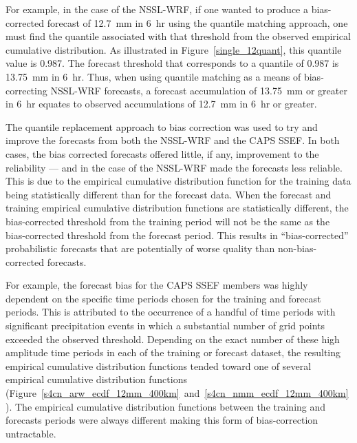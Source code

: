 For example, in the case of the NSSL-WRF, if one wanted to produce a bias-corrected forecast of \mbox{12.7 mm} in \mbox{6 hr} using the quantile matching approach, one must find the quantile associated with that threshold from the observed empirical cumulative distribution.
As illustrated in \mbox{Figure \ref{single_12quant}}, this quantile value is 0.987.
The forecast threshold that corresponds to a quantile of 0.987 is \mbox{13.75 mm} in \mbox{6 hr}.
Thus, when using quantile matching as a means of bias-correcting NSSL-WRF forecasts, a forecast accumulation of \mbox{13.75 mm} or greater in \mbox{6 hr} equates to observed accumulations of \mbox{12.7 mm} in \mbox{6 hr} or greater.


The quantile replacement approach to bias correction was used to try and improve the forecasts from both the NSSL-WRF and the CAPS SSEF.
In both cases, the bias corrected forecasts offered little, if any, improvement to the reliability --- and in the case of the NSSL-WRF made the forecasts less reliable.
This is due to the empirical cumulative distribution function for the training data being statistically different than for the forecast data.
When the forecast and training empirical cumulative distribution functions are statistically different, the bias-corrected threshold from the training period will not be the same as the bias-corrected threshold from the forecast period.
This results in ``bias-corrected'' probabilistic forecasts that are potentially of worse quality than non-bias-corrected forecasts.


For example, the forecast bias for the CAPS SSEF members was highly dependent on the specific time periods chosen for the training and forecast periods.
This is attributed to the occurrence of a handful of time periods with significant precipitation events in which a substantial number of grid points exceeded the observed threshold.
Depending on the exact number of these high amplitude time periods in each of the training or forecast dataset, the resulting empirical cumulative distribution functions tended toward one of several empirical cumulative distribution functions (\mbox{Figure \ref{s4cn_arw_ecdf_12mm_400km} and \ref{s4cn_nmm_ecdf_12mm_400km}}).
The empirical cumulative distribution functions between the training and forecasts periods were always different making this form of bias-correction untractable.


